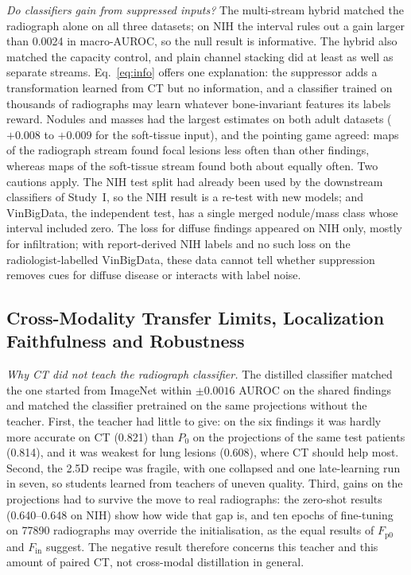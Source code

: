 \emph{Do classifiers gain from suppressed inputs?} The multi-stream hybrid matched the radiograph alone on all three datasets; on NIH the
interval rules out a gain larger than 0.0024 in macro-AUROC, so the null result is informative. The hybrid also matched the capacity
control, and plain channel stacking did at least as well as separate streams. Eq.~\eqref{eq:info} offers one explanation: the suppressor
adds a transformation learned from CT but no information, and a classifier trained on thousands of radiographs may learn whatever
bone-invariant features its labels reward. Nodules and masses had the largest estimates on both adult datasets ($+0.008$ to $+0.009$ for
the soft-tissue input), and the pointing game agreed: maps of the radiograph stream found focal lesions less often than other findings,
whereas maps of the soft-tissue stream found both about equally often. Two cautions apply. The NIH test split had already been used by the
downstream classifiers of Study~I, so the NIH result is a re-test with new models; and VinBigData, the independent test, has a single merged
nodule/mass class whose interval included zero. The loss for diffuse findings appeared on NIH only, mostly for infiltration; with
report-derived NIH labels \cite{wang2017chestxray} and no such loss on the radiologist-labelled VinBigData, these data cannot tell whether
suppression removes cues for diffuse disease or interacts with label noise.

\subsection{Cross-Modality Transfer Limits, Localization Faithfulness and Robustness}
\label{sec:d-xm}
\emph{Why CT did not teach the radiograph classifier.} The distilled classifier matched the one started from ImageNet within $\pm0.0016$
AUROC on the shared findings and matched the classifier pretrained on the same projections without the teacher. First, the teacher had
little to give: on the six findings it was hardly more accurate on CT (0.821) than $P_0$ on the projections of the same test patients
(0.814), and it was weakest for lung lesions (0.608), where CT should help most. Second, the 2.5D recipe was fragile, with one collapsed and
one late-learning run in seven, so students learned from teachers of uneven quality. Third, gains on the projections had to survive the move
to real radiographs: the zero-shot results (0.640--0.648 on NIH) show how wide that gap is, and ten epochs of fine-tuning on \num{77890}
radiographs may override the initialisation, as the equal results of $F_{\mathrm{p0}}$ and $F_{\mathrm{in}}$ suggest. The negative result
therefore concerns this teacher and this amount of paired CT, not cross-modal distillation in general.

